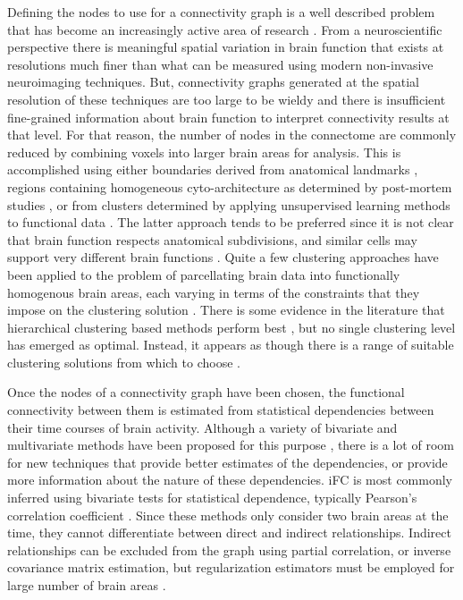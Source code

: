 \documentclass{bmcart}
\begin{document}
Defining the nodes to use for a connectivity graph is a well described problem that has become an increasingly active area of research \cite{Thirion2014}. From a neuroscientific perspective there is meaningful spatial variation in brain function that exists at resolutions much finer than what can be measured using modern non-invasive neuroimaging techniques. But, connectivity graphs generated at the spatial resolution of these techniques are too large to be wieldy and there is insufficient fine-grained information about brain function to interpret connectivity results at that level. For that reason, the number of nodes in the connectome are commonly reduced by combining voxels into larger brain areas for analysis. This is accomplished using either boundaries derived from anatomical landmarks \cite{Desikan2006,AAL2002}, regions containing homogeneous cyto-architecture as determined by post-mortem studies \cite{Eickhoff2008}, or from clusters determined by applying unsupervised learning methods to functional data \cite{Bellec2006,Craddock2012}. The latter approach tends to be preferred since it is not clear that brain function respects anatomical subdivisions, and similar cells may support very different brain functions \cite{Craddock2012}. Quite a few clustering approaches have been applied to the problem of parcellating brain data into functionally homogenous brain areas, each varying in terms of the constraints that they impose on the clustering solution  \cite{Craddock2012,Blumensath2013,Bellec2006,Thirion2006,Zalesky2010,Flandin2002,Thirion2014}. There is some evidence in the literature that hierarchical clustering based methods perform best \cite{Blumensath2013,Thirion2014}, but no single clustering level has emerged as optimal. Instead, it appears as though there is a range of suitable clustering solutions from which to choose  \cite{Craddock2012,Thirion2014}.  

Once the nodes of a connectivity graph have been chosen, the functional connectivity between them is estimated from statistical dependencies between their time courses of brain activity. Although a variety of bivariate and multivariate methods have been proposed for this purpose \cite{Smith2011,Varoquaux2013}, there is a lot of room for new techniques that provide better estimates of the dependencies, or provide more information about the nature of these dependencies. iFC is most commonly inferred using bivariate tests for statistical dependence, typically Pearson's correlation coefficient \cite{Biswal1995}. Since these methods only consider two brain areas at the time, they cannot differentiate between direct and indirect relationships. Indirect relationships can be excluded from the graph using partial correlation, or inverse covariance matrix estimation, but regularization estimators must be employed for large number of brain areas \cite{Ryali2012,Varoquaux2013}. 
\end{document}

